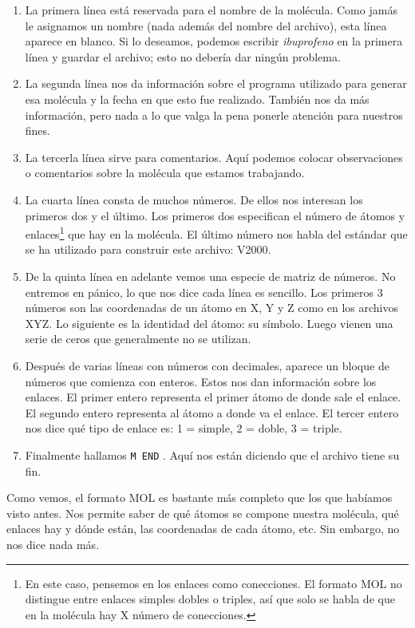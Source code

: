 \documentclass[10pt,letterpaper]{article}
\newcommand{\inlinecode}[1]{
\colorbox{light-gray}{\texttt{#1}}
}
\begin{document}
\begin{enumerate}
\item La primera l\'inea est\'a reservada para el nombre de la mol\'ecula. Como jam\'as le asignamos un nombre (nada adem\'as del nombre del archivo), esta l\'inea aparece en blanco. Si lo deseamos, podemos escribir \textit{ibuprofeno} en la primera l\'inea y guardar el archivo; esto no deber\'ia dar ning\'un problema.
\item La segunda l\'inea nos da informaci\'on sobre el programa utilizado para generar esa mol\'ecula y la fecha en que esto fue realizado. Tambi\'en nos da m\'as informaci\'on, pero nada a lo que valga la pena ponerle atenci\'on para nuestros fines.
\item La tercerla l\'inea sirve para comentarios. Aqu\'i podemos colocar observaciones o comentarios sobre la mol\'ecula que estamos trabajando.
\item La cuarta l\'inea consta de muchos n\'umeros. De ellos nos interesan los primeros dos y el \'ultimo. Los primeros dos especifican el n\'umero de \'atomos y enlaces\footnote{En este caso, pensemos en los enlaces como conecciones. El formato MOL no distingue entre enlaces simples dobles o triples, as\'i que solo se habla de que en la mol\'ecula hay X n\'umero de conecciones.} que hay en la mol\'ecula. El \'ultimo n\'umero nos habla del est\'andar que se ha utilizado para construir este archivo: V2000.
\item De la quinta l\'inea en adelante vemos una especie de matriz de n\'umeros. No entremos en p\'anico, lo que nos dice cada l\'inea es sencillo. Los primeros 3 n\'umeros son las coordenadas de un \'atomo en X, Y y Z como en los archivos XYZ. Lo siguiente es la identidad del \'atomo: su s\'imbolo. Luego vienen una serie de ceros que generalmente no se utilizan.
\item Despu\'es de varias l\'ineas con n\'umeros con decimales, aparece un bloque de n\'umeros que comienza con enteros. Estos nos dan informaci\'on sobre los enlaces. El primer entero representa el primer \'atomo de donde sale el enlace. El segundo entero representa al \'atomo a donde va el enlace. El tercer entero nos dice qu\'e tipo de enlace es: 1 = simple, 2 = doble, 3 = triple.
\item Finalmente hallamos \inlinecode{M END}. Aqu\'i nos est\'an diciendo que el archivo tiene su fin.
\end{enumerate}

Como vemos, el formato MOL es bastante m\'as completo que los que hab\'iamos visto antes. Nos permite saber de qu\'e \'atomos se compone nuestra mol\'ecula, qu\'e enlaces hay y d\'onde est\'an, las coordenadas de cada \'atomo, etc. Sin embargo, no nos dice nada m\'as.\\
\end{document}
